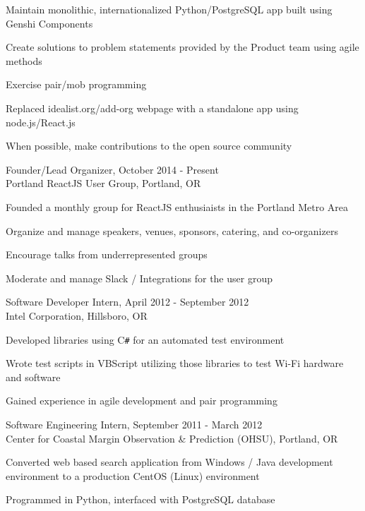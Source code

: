\documentclass{res} %
\newenvironment{packed_item}{
\begin{itemize}
  \setlength{\itemsep}{1pt}
  \setlength{\parskip}{0pt}
  \setlength{\parsep}{0pt}
}{\end{itemize}}
\begin{document}
\begin{resume}
\begin{packed_item}
	\item{Maintain monolithic, internationalized Python/PostgreSQL app built using \\Genshi Components}
	\item{Create solutions to problem statements provided by the Product team using agile methods}
	\item{Exercise pair/mob programming}
	\item{Replaced idealist.org/add-org webpage with a standalone app using node.js/React.js}
	\item{When possible, make contributions to the open source community}
\end{packed_item}


Founder/Lead Organizer, October 2014 - Present\\
Portland ReactJS User Group, Portland, OR

\begin{packed_item}
    \item{Founded a monthly group for ReactJS enthusiaists in the Portland Metro Area}
    \item{Organize and manage speakers, venues, sponsors, catering, and co-organizers}
    \item{Encourage talks from underrepresented groups}
    \item{Moderate and manage Slack / Integrations for the user group}
\end{packed_item}


Software Developer Intern, April 2012 - September 2012\\
Intel Corporation, Hillsboro, OR

\begin{packed_item}
	\item{Developed libraries using C\verb!#! for an automated test environment}
	\item{Wrote test scripts in VBScript utilizing those libraries to test Wi-Fi hardware and software}
	\item{Gained experience in agile development and pair programming}
\end{packed_item}

Software Engineering Intern, September 2011 - March 2012\\
Center for Coastal Margin Observation \& Prediction (OHSU), Portland, OR

\begin{packed_item}
	\item{Converted web based search application from Windows / Java development
			environment to a production CentOS (Linux) environment}
	\item{Programmed in Python, interfaced with PostgreSQL database}
\end{packed_item}


\end{resume}
\end{document}
